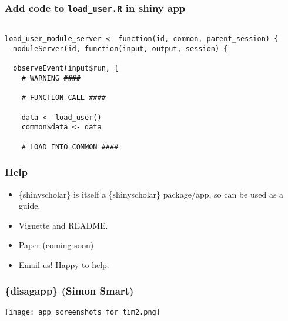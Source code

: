 \documentclass[handout, aspectratio = 169, xcolor={dvipsnames}]{beamer}
\begin{document}
\begin{frame}[fragile]
\frametitle{Add code to \texttt{load\_user.R} in shiny app}
\footnotesize{
\vspace{1mm}
\begin{Verbatim}

load_user_module_server <- function(id, common, parent_session) {
  moduleServer(id, function(input, output, session) {

  observeEvent(input$run, {
    # WARNING ####

    # FUNCTION CALL ####
    
    data <- load_user()
    common$data <- data
    
    # LOAD INTO COMMON ####

\end{Verbatim}
}
\end{frame} 





\begin{frame}
\frametitle{Help}

\begin{itemize}
\item \{shinyscholar\} is itself a \{shinyscholar\} package/app, so can be used as a guide.
\item Vignette and README.
\item Paper (coming soon)
\item Email us! Happy to help.
\end{itemize}

\end{frame} 











\begin{frame}
\frametitle{\{disagapp\} (Simon Smart)}
\texttt{[image: app\_screenshots\_for\_tim2.png]}
\end{frame} 
\end{document}
